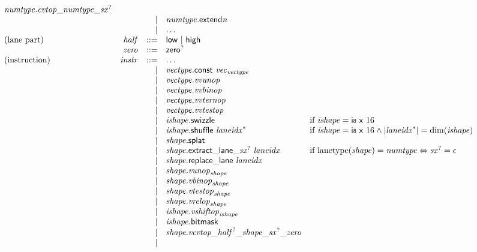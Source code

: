 $$\begin{array}{@{}lrrl@{}l@{}}
{\mathit{numtype}} . {{{{{\mathit{cvtop}}}{\mathsf{\_}}}{{\mathit{numtype}}}}{\mathsf{\_}}}{{{\mathit{sx}}^?}} \\ &&|&
{{\mathit{numtype}}.\mathsf{extend}}{{\mathit{n}}} \\ &&|&
\dots \\
\mbox{(lane part)} & {\mathit{half}} &::=& \mathsf{low} ~|~ \mathsf{high} \\
& {\mathit{zero}} &::=& {\mathsf{zero}^?} \\
\mbox{(instruction)} & {\mathit{instr}} &::=& \dots \\ &&|&
{\mathit{vectype}}.\mathsf{const}~{{\mathit{vec}}}_{{\mathit{vectype}}} \\ &&|&
{\mathit{vectype}} . {\mathit{vvunop}} \\ &&|&
{\mathit{vectype}} . {\mathit{vvbinop}} \\ &&|&
{\mathit{vectype}} . {\mathit{vvternop}} \\ &&|&
{\mathit{vectype}} . {\mathit{vvtestop}} \\ &&|&
{\mathit{ishape}}.\mathsf{swizzle} &\quad
  \mbox{if}~{\mathit{ishape}} = \mathsf{i{\scriptstyle8}}~\mathsf{x}~16 \\ &&|&
{\mathit{ishape}}.\mathsf{shuffle}~{{\mathit{laneidx}}^\ast} &\quad
  \mbox{if}~{\mathit{ishape}} = \mathsf{i{\scriptstyle8}}~\mathsf{x}~16 \land {|{{\mathit{laneidx}}^\ast}|} = {\mathrm{dim}}({\mathit{ishape}}) \\ &&|&
{\mathit{shape}}.\mathsf{splat} \\ &&|&
{{\mathit{shape}}.\mathsf{extract\_lane\_}}{{{\mathit{sx}}^?}}~{\mathit{laneidx}} &\quad
  \mbox{if}~{\mathrm{lanetype}}({\mathit{shape}}) = {\mathit{numtype}} \Leftrightarrow {{\mathit{sx}}^?} = \epsilon \\ &&|&
{\mathit{shape}}.\mathsf{replace\_lane}~{\mathit{laneidx}} \\ &&|&
{\mathit{shape}} . {{\mathit{vunop}}}_{{\mathit{shape}}} \\ &&|&
{\mathit{shape}} . {{\mathit{vbinop}}}_{{\mathit{shape}}} \\ &&|&
{\mathit{shape}} . {{\mathit{vtestop}}}_{{\mathit{shape}}} \\ &&|&
{\mathit{shape}} . {{\mathit{vrelop}}}_{{\mathit{shape}}} \\ &&|&
{\mathit{ishape}} . {{\mathit{vshiftop}}}_{{\mathit{ishape}}} \\ &&|&
{\mathit{ishape}}.\mathsf{bitmask} \\ &&|&
{\mathit{shape}} . {{{{{{{{{\mathit{vcvtop}}}{\mathsf{\_}}}{{{\mathit{half}}^?}}}{\mathsf{\_}}}{{\mathit{shape}}}}{\mathsf{\_}}}{{{\mathit{sx}}^?}}}{\mathsf{\_}}}{{\mathit{zero}}} \\ &&|&

\end{array}$$
